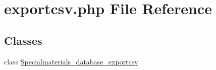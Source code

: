 \hypertarget{exportcsv_8php}{\section{exportcsv.\+php File Reference}
\label{exportcsv_8php}
}
\subsection*{Classes}
\begin{DoxyCompactItemize}
\item 
class \hyperlink{classSpecialmaterials__database__exportcsv}{Specialmaterials\+\_\+database\+\_\+exportcsv}
\end{DoxyCompactItemize}
